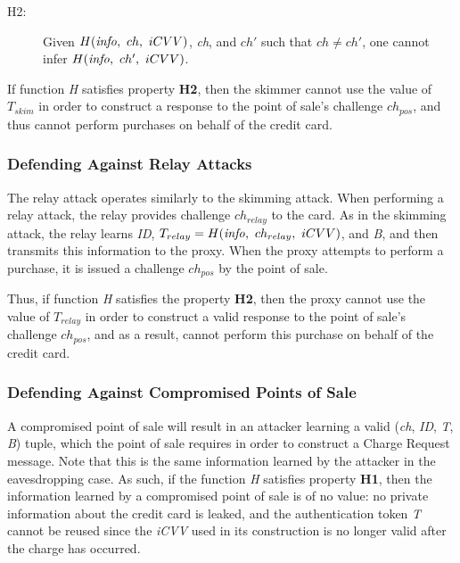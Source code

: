 \begin{description}
\item[H2:] Given $H(\textrm{\emph{info}},~ ch,~ iCVV)$, \emph{ch}, and $ch'$ such that $ch \neq ch'$, one cannot infer $H(\textrm{\emph{info}},~ ch',~ iCVV)$.
\end{description}

If function \emph{H} satisfies property \textbf{H2}, then the skimmer cannot use the value of $T_{skim}$ in order to construct a response to the point of sale's challenge $ch_{pos}$, and thus cannot perform purchases on behalf of the credit card.






\subsubsection*{Defending Against Relay Attacks}
The relay attack operates similarly to the skimming attack.
When performing a relay attack, the relay provides challenge $ch_{relay}$ to the card.
As in the skimming attack, the relay learns \emph{ID}, $T_{relay} = H(\textrm{\emph{info}},~ ch_{relay},~ iCVV)$, and \emph{B}, and then transmits this information to the proxy.
When the proxy attempts to perform a purchase, it is issued a challenge $ch_{pos}$ by the point of sale.

Thus, if function \emph{H} satisfies the property \textbf{H2},
	then the proxy cannot use the value of $T_{relay}$ in order to construct a valid response to the point of sale's challenge $ch_{pos}$,
	and as a result, cannot perform this purchase on behalf of the credit card.






\subsubsection*{Defending Against Compromised Points of Sale}
A compromised point of sale will result in an attacker learning a valid (\emph{ch}, \emph{ID}, \emph{T}, \emph{B}) tuple,
	which the point of sale requires in order to construct a Charge Request message.
Note that this is the same information learned by the attacker in the eavesdropping case.
As such, if the function \emph{H} satisfies property \textbf{H1}, then the information learned by a compromised point of sale is of no value:
	no private information about the credit card is leaked,
	and the authentication token \emph{T} cannot be reused since the \emph{iCVV} used in its construction is no longer valid after the charge has occurred.



